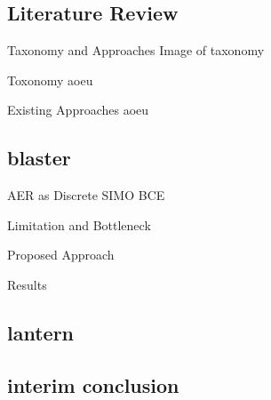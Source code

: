 
\subsection{Literature Review}

\begin{frame}{Taxonomy and Approaches}
    Image of taxonomy

    \begin{block}{Toxonomy}
        aoeu
    \end{block}

    \begin{block}{Existing Approaches}
        aoeu
    \end{block}


\end{frame}

\subsection{blaster}

\begin{frame}{AER as Discrete SIMO BCE}

\end{frame}

\begin{frame}{Limitation and Bottleneck}

\end{frame}

\begin{frame}{Proposed Approach}

\end{frame}

\begin{frame}{Results}

\end{frame}


\subsection{lantern}
\subsection{interim conclusion}
